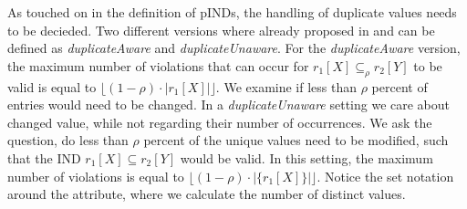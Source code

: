 \noindent As touched on in the definition of pINDs, the handling of duplicate values needs to be decieded. Two different versions where already proposed in \cite{bauckmann2006efficiently} and can be defined as \textit{duplicateAware} and \textit{duplicateUnaware}.
For the \textit{duplicateAware} version, the maximum number of violations that can occur for $r_1[X] \subseteq_{\rho} r_2[Y]$ to be valid is equal to $\lfloor (1-\rho) \cdot |r_1[X]| \rfloor$. We examine if less than $\rho$ percent of entries would need to be changed. In a \textit{duplicateUnaware} setting we care about changed value, while not regarding their number of occurrences. We ask the question, do less than $\rho$ percent of the unique values need to be modified, such that the IND $r_1[X] \subseteq r_2[Y]$ would be valid. In this setting, the maximum number of violations is equal to $\lfloor(1-\rho) \cdot |\{r_1[X]\}| \rfloor$. Notice the set notation around the attribute, where we calculate the number of distinct values. \\

